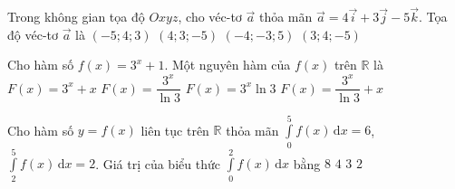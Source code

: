 \begin{ex}%
Trong không gian tọa độ $Oxyz$, cho véc-tơ $\overrightarrow{a}$ thỏa mãn $\overrightarrow{a}=4\overrightarrow{i}+3\overrightarrow{j}-5\overrightarrow{k}$. Tọa độ véc-tơ $\overrightarrow{a}$ là
\choice
{$(-5;4;3)$}
{\True $(4;3;-5)$}
{$(-4;-3;5)$}
{$(3;4;-5)$}
\end{ex}
\begin{ex}%
	Cho hàm số $f(x)=3^x+1$. Một nguyên hàm của $f(x)$ trên $\mathbb{R}$ là
	\choice
	{$F(x)=3^x+x$}
	{$F(x)=\dfrac{3^x}{\ln 3}$}
	{$F(x)=3^x \ln 3$}
	{\True $F(x)=\dfrac{3^x}{\ln 3}+x$}
\end{ex}

\begin{ex}%
	Cho hàm số $y=f(x)$ liên tục trên $\mathbb{R}$ thỏa mãn $\displaystyle\int\limits_0^5 f(x)\mathrm{\,d}x=6$, $\displaystyle\int\limits_2^5 f(x)\mathrm{\,d}x=2$. Giá trị của biểu thức $\displaystyle\int\limits_0^2 f(x)\mathrm{\,d}x$ bằng
	\choice
	{$8$}
	{\True $4$}
	{$3$}
	{$2$}
\end{ex}

